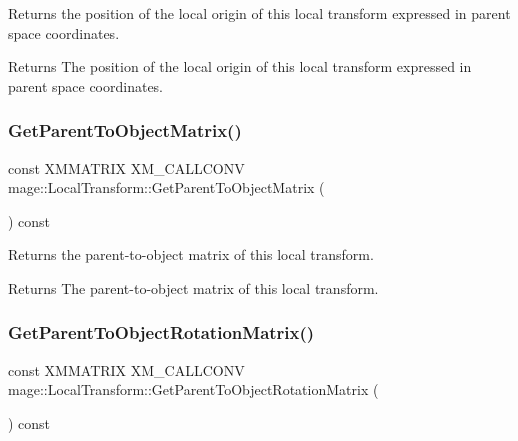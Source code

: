 Returns the position of the local origin of this local transform expressed in parent space coordinates.

\begin{DoxyReturn}{Returns}
The position of the local origin of this local transform expressed in parent space coordinates. 
\end{DoxyReturn}
\hypertarget{classmage_1_1_local_transform_a3cc177e24cac45b28231943f7e7d7b03}{}\label{classmage_1_1_local_transform_a3cc177e24cac45b28231943f7e7d7b03} 
\subsubsection{\texorpdfstring{Get\+Parent\+To\+Object\+Matrix()}{GetParentToObjectMatrix()}}
{\footnotesize\ttfamily const X\+M\+M\+A\+T\+R\+IX X\+M\+\_\+\+C\+A\+L\+L\+C\+O\+NV mage\+::\+Local\+Transform\+::\+Get\+Parent\+To\+Object\+Matrix (\begin{DoxyParamCaption}{ }\end{DoxyParamCaption}) const\hspace{0.3cm}{\ttfamily [noexcept]}}

Returns the parent-\/to-\/object matrix of this local transform.

\begin{DoxyReturn}{Returns}
The parent-\/to-\/object matrix of this local transform. 
\end{DoxyReturn}
\hypertarget{classmage_1_1_local_transform_a5054e57409d6852adcde6283ca8a5c49}{}\label{classmage_1_1_local_transform_a5054e57409d6852adcde6283ca8a5c49} 
\subsubsection{\texorpdfstring{Get\+Parent\+To\+Object\+Rotation\+Matrix()}{GetParentToObjectRotationMatrix()}}
{\footnotesize\ttfamily const X\+M\+M\+A\+T\+R\+IX X\+M\+\_\+\+C\+A\+L\+L\+C\+O\+NV mage\+::\+Local\+Transform\+::\+Get\+Parent\+To\+Object\+Rotation\+Matrix (\begin{DoxyParamCaption}{ }\end{DoxyParamCaption}) const\hspace{0.3cm}{\ttfamily [noexcept]}}

